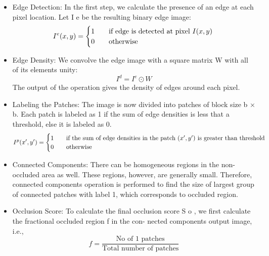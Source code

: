 \documentclass{sig-alternate}
\begin{document}
\begin{itemize}
  \item Edge Detection: In the first step, we calculate the presence of
an edge at each pixel location. Let I e be the resulting binary
edge image:
         \begin{equation}
              I^e(x,y) = \begin{cases} 
               1 & \quad \text{if edge is detected at pixel }I(x, y) \\  
               0 & \quad \text{otherwise} 
              \end{cases} \\
       \end{equation}
  \item Edge Density: We convolve the edge image with a square
matrix W with all of its elements unity:
         \begin{equation}
              I^d = I^e \odot W
       \end{equation}
      The output of the operation gives the density of edges around
each pixel.
  \item Labeling the Patches: The image is now divided into patches
of block size b × b. Each patch is labeled as 1 if the sum of
edge densities is less that a threshold, else it is labeled as 0.
        \begin{equation}
              I^p(x',y') = \begin{cases} 
               1 & \quad \text{if the sum of edge densities in the patch $(x',y')$ is greater than threshold} \\  
               0 & \quad \text{otherwise} 
              \end{cases} \\
       \end{equation}
   \item Connected Components: There can be homogeneous regions
in the non-occluded area as well. These regions, however, are
generally small. Therefore, connected components operation
is performed to find the size of largest group of connected
patches with label 1, which corresponds to occluded region.

  \item Occlusion Score: To calculate the final occlusion score S o ,
we first calculate the fractional occluded region f in the con-
nected components output image, i.e.,
    \begin{equation}
              f = \frac{\text{No of 1 patches}}{\mbox{Total number of patches}}
       \end{equation}

\end{itemize}
\end{document}
